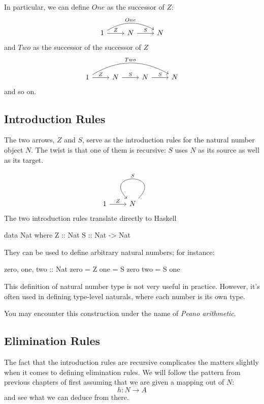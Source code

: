 \documentclass[DaoFP]{subfiles}
\begin{document}
In particular, we can define $One$ as the successor of $Z$:
\[
 \begin{tikzcd}
 1
 \arrow[rr, bend left, "One"]
 \arrow[r, "Z"]
 &N
  \arrow[r, "S"]
&N
  \end{tikzcd}
\]
and $Two$ as the successor of the successor of $Z$
\[
 \begin{tikzcd}
 1
 \arrow[rrr, bend left, "Two"]
 \arrow[r, "Z"]
 &N
  \arrow[r, "S"]
&N
  \arrow[r, "S"]
 &N
 \end{tikzcd}
\]
and so on.

\subsection{Introduction Rules}

The two arrows, $Z$ and $S$, serve as the introduction rules for the natural number object $N$. The twist is that one of them is recursive: $S$ uses $N$ as its source as well as its target.

\[
 \begin{tikzcd}
 1
 \arrow[r, "Z"]
 &N
 \arrow[loop, "S"']
 \end{tikzcd}
\]
The two introduction rules translate directly to Haskell


\begin{haskell}
data Nat where
  Z :: Nat
  S :: Nat -> Nat
\end{haskell}
They can be used to define arbitrary natural numbers; for instance:

\begin{haskell}
zero, one, two :: Nat
zero = Z
one  = S zero
two  = S one
\end{haskell}

This definition of natural number type is not very useful in practice. However, it's often used in defining type-level naturals, where each number is its own type. 

You may encounter this construction under the name of \emph{Peano arithmetic}.

\subsection{Elimination Rules}

The fact that the introduction rules are recursive complicates the matters slightly when it comes to defining elimination rules. We will follow the pattern from previous chapters of first assuming that we are given a mapping out of $N$:
\[ h \colon N \to A \]
and see what we can deduce from there. 
\end{document}
